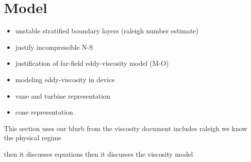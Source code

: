 \section{Model}

\begin{itemize}
\item unstable stratified boundary layers (raleigh number estimate)
\item justify incompressible N-S
\item justification of far-field eddy-viscosity model (M-O)
\item modeling eddy-viscosity in device 
\item vane and turbine representation
\item cone representation
\end{itemize}

This section uses our blurb from the viscosity document
includes raleigh 
we know the physical regime

then it discusses equations
then it discusses the viscosity model
